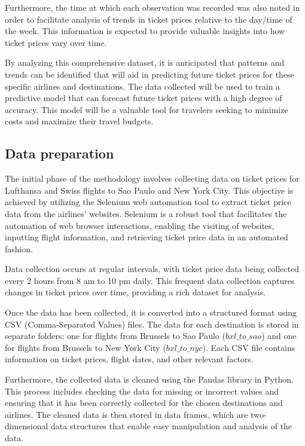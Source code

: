 Furthermore, the time at which each observation was recorded was also noted in order to facilitate analysis of trends in ticket prices relative to the day/time of the week.
This information is expected to provide valuable insights into how ticket prices vary over time.

By analyzing this comprehensive dataset, it is anticipated that patterns and trends can be identified that will aid in predicting future ticket prices for these specific airlines and destinations.
The data collected will be used to train a predictive model that can forecast future ticket prices with a high degree of accuracy.
This model will be a valuable tool for travelers seeking to minimize costs and maximize their travel budgets.

\subsection{Data preparation}
\label{sec:data}
The initial phase of the methodology involves collecting data on ticket prices for Lufthansa and Swiss flights to Sao Paulo and New York City.
This objective is achieved by utilizing the Selenium web automation tool to extract ticket price data from the airlines’ websites.
Selenium is a robust tool that facilitates the automation of web browser interactions, enabling the visiting of websites, inputting flight information, and retrieving ticket price data in an automated fashion.

Data collection occurs at regular intervals, with ticket price data being collected every 2 hours from 8 am to 10 pm daily.
This frequent data collection captures changes in ticket prices over time, providing a rich dataset for analysis.

Once the data has been collected, it is converted into a structured format using CSV (Comma-Separated Values) files.
The data for each destination is stored in separate folders: one for flights from Brussels to Sao Paulo ($bxl\_to\_sao$) and one for flights from Brussels to New York City ($bxl\_to\_nyc$).
Each CSV file contains information on ticket prices, flight dates, and other relevant factors.

Furthermore, the collected data is cleaned using the Pandas library in Python.
This process includes checking the data for missing or incorrect values and ensuring that it has been correctly collected for the chosen destinations and airlines.
The cleaned data is then stored in data frames, which are two-dimensional data structures that enable easy manipulation and analysis of the data.

